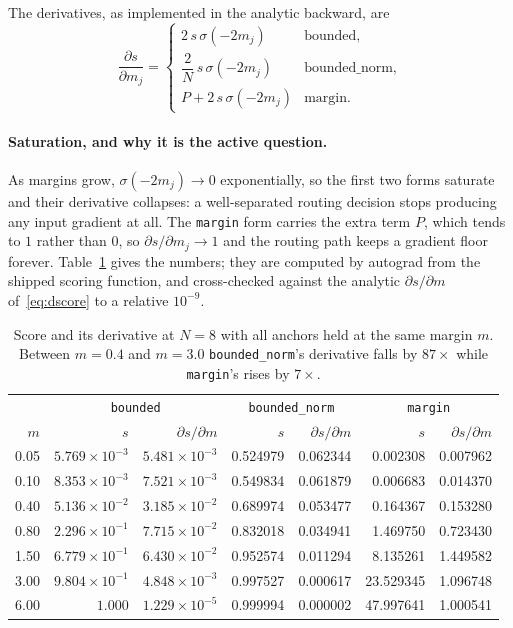 \documentclass[11pt]{article}
\newcommand{\NAP}{N}
\begin{document}
The derivatives, as implemented in the analytic backward, are
\begin{equation}
  \frac{\partial s}{\partial m_j} =
  \begin{cases}
    2\,s\,\sigma(-2m_j) & \text{bounded},\\[2pt]
    \dfrac{2}{\NAP}\,s\,\sigma(-2m_j) & \text{bounded\_norm},\\[4pt]
    P + 2\,s\,\sigma(-2m_j) & \text{margin}.
  \end{cases}
  \label{eq:dscore}
\end{equation}

\paragraph{Saturation, and why it is the active question.}
As margins grow, $\sigma(-2m_j)\to0$ exponentially, so the first two forms saturate and
their derivative collapses: a well-separated routing decision stops producing any input
gradient at all. The \texttt{margin} form carries the extra term $P$, which tends to $1$
rather than $0$, so $\partial s/\partial m_j\to1$ and the routing path keeps a gradient
floor forever. Table~\ref{tab:scores} gives the numbers; they are computed by autograd
from the shipped scoring function, and cross-checked against the analytic
$\partial s/\partial m$ of~\eqref{eq:dscore} to a relative $10^{-9}$.

\begin{table}[h]
\centering
\begin{tabular}{r|rr|rr|rr}
\toprule
& \multicolumn{2}{c|}{\texttt{bounded}} & \multicolumn{2}{c|}{\texttt{bounded\_norm}}
& \multicolumn{2}{c}{\texttt{margin}} \\
$m$ & $s$ & $\partial s/\partial m$ & $s$ & $\partial s/\partial m$
    & $s$ & $\partial s/\partial m$ \\
\midrule
0.05 & $5.769\!\times\!10^{-3}$ & $5.481\!\times\!10^{-3}$ & 0.524979 & 0.062344 & 0.002308 & 0.007962 \\
0.10 & $8.353\!\times\!10^{-3}$ & $7.521\!\times\!10^{-3}$ & 0.549834 & 0.061879 & 0.006683 & 0.014370 \\
0.40 & $5.136\!\times\!10^{-2}$ & $3.185\!\times\!10^{-2}$ & 0.689974 & 0.053477 & 0.164367 & 0.153280 \\
0.80 & $2.296\!\times\!10^{-1}$ & $7.715\!\times\!10^{-2}$ & 0.832018 & 0.034941 & 1.469750 & 0.723430 \\
1.50 & $6.779\!\times\!10^{-1}$ & $6.430\!\times\!10^{-2}$ & 0.952574 & 0.011294 & 8.135261 & 1.449582 \\
3.00 & $9.804\!\times\!10^{-1}$ & $4.848\!\times\!10^{-3}$ & 0.997527 & 0.000617 & 23.529345 & 1.096748 \\
6.00 & $1.000$ & $1.229\!\times\!10^{-5}$ & 0.999994 & 0.000002 & 47.997641 & 1.000541 \\
\bottomrule
\end{tabular}
\caption{Score and its derivative at $\NAP=8$ with all anchors held at the same margin
$m$. Between $m=0.4$ and $m=3.0$ \texttt{bounded\_norm}'s derivative falls by
$87\times$ while \texttt{margin}'s rises by $7\times$.}
\label{tab:scores}
\end{table}
\end{document}
